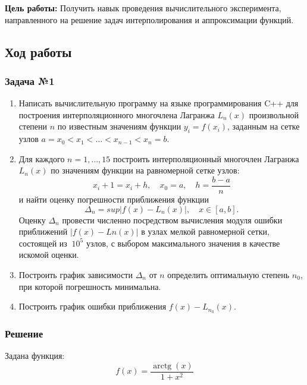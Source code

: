 \documentclass[a4paper, fontsize=14pt]{article}
\begin{document}

\textbf{Цель работы:}  Получить навык проведения вычислительного эксперимента, направленного на решение задач интерполирования и аппроксимации функций.
\subsection*{{Ход работы}}
\subsubsection*{Задача №1}
\begin{enumerate}
   \item	Написать вычислительную программу на языке программирования C++ для построения интерполяционного многочлена Лагранжа $L_n(x)$ произвольной степени $n$ по известным значениям функции $y_i=f(x_i)$, заданным на сетке узлов $a=x_0<x_1<…<x_{n-1}<x_n=b.$
   \item Для каждого $n=1,\dots,15$ построить интерполяционный многочлен Лагранжа $L_n(x)$ по значениям функции на равномерной сетке узлов:
           \begin{equation}
            \label{uniform_grid}
            x_i+1 =x_i+h, \quad  x_0=a,  \quad  h=\frac{b-a}{n}
           \end{equation}
             и найти оценку погрешности приближения функции  
             \begin{equation}
                \label{delta}
                \Delta_n=sup|f(x)-L_n(x)|,  \quad  x \in [a,b].
             \end{equation}
   Оценку $\Delta_n$ провести численно посредством вычисления модуля ошибки приближений $|f(x)-Ln(x)|$ в узлах мелкой равномерной сетки, состоящей из $~10^5$ узлов, с выбором максимального значения в качестве искомой оценки.    
   \item	Построить график зависимости $\Delta_n$ от $n$ определить оптимальную степень $n_0$, при которой погрешность минимальна. 
\item	Построить график ошибки приближения $f(x)-L_{n_0}(x)$.
\end{enumerate}
\subsubsection*{Решение}
Задана функция:
\begin{equation}
    \label{target_f}
    f(x) = \frac{\operatorname{arctg}(x)}{1+x^2}
\end{equation}
\end{document}
